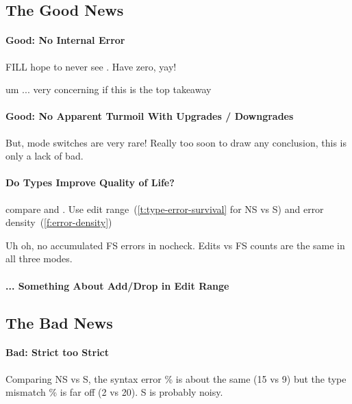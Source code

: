 \documentclass[english,submission,cleveref]{programming}
\begin{document}
\subsection{The Good News}

\paragraph{Good: No Internal Error}

FILL hope to never see .
Have zero, yay!

um ... very concerning if this is the top takeaway


\paragraph{Good: No Apparent Turmoil With Upgrades / Downgrades}

But, mode switches are very rare!
Really too soon to draw any conclusion, this is only a lack of bad.


\paragraph{Do Types Improve Quality of Life?}

\FILL{} compare \mnonstrict{} and \mstrict{}.
Use edit range~(\cref{t:type-error-survival} for NS vs S)
and error density~(\cref{f:error-density})

Uh oh, no accumulated FS errors in nocheck.
Edits vs FS counts are the same in all three modes.


\paragraph{... Something About Add/Drop in Edit Range}

\FILL{}

\subsection{The Bad News}

\paragraph{Bad: Strict too Strict}

\FILL{}

Comparing NS vs S, the syntax error \% is about the same (15 vs 9)
but the type mismatch \% is far off (2 vs 20).
S is probably noisy.
\end{document}
